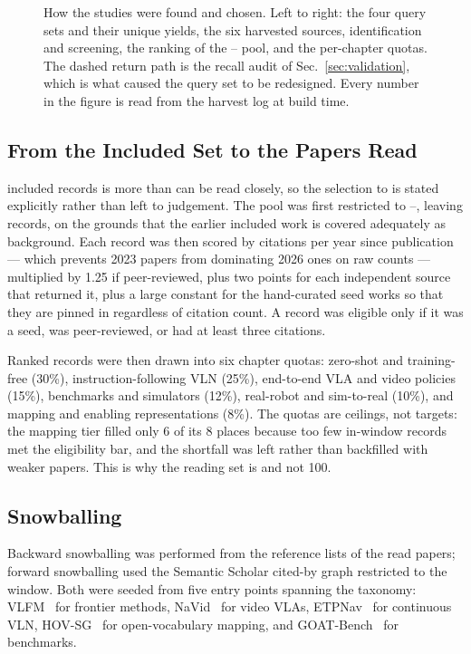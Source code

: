 \documentclass[journal]{IEEEtran}
\begin{document}
\begin{figure}[!t]
  \centering
  \resizebox{\textwidth}{!}{}
  \caption{How the \ReadTotal{} studies were found and chosen. Left to
  right: the four query sets and their unique yields, the six harvested
  sources, identification and screening, the ranking of the
  \ReadFrom--\ReadTo{} pool, and the per-chapter quotas. The dashed return
  path is the recall audit of Sec.~\ref{sec:validation}, which is what
  caused the query set to be redesigned. Every number in the figure is read
  from the harvest log at build time.}
  \label{fig:selection}
\end{figure}

\subsection{From the Included Set to the Papers Read}\label{sec:readinglist}
\ScrInclude{} included records is more than can be read closely, so the
selection to \ReadTotal{} is stated explicitly rather than left to
judgement. The pool was first restricted to \ReadFrom--\ReadTo{},
leaving \ReadPool{} records, on the grounds that the earlier included work
is covered adequately as background. Each record was then scored by
citations per year since publication --- which prevents 2023 papers from
dominating 2026 ones on raw counts --- multiplied by 1.25 if peer-reviewed,
plus two points for each independent source that returned it, plus a large
constant for the hand-curated seed works so that they are pinned in
regardless of citation count. A record was eligible only if it was a seed,
was peer-reviewed, or had at least three citations.

Ranked records were then drawn into six chapter quotas: zero-shot and
training-free (30\%), instruction-following VLN (25\%), end-to-end VLA and
video policies (15\%), benchmarks and simulators (12\%), real-robot and
sim-to-real (10\%), and mapping and enabling representations (8\%). The
quotas are ceilings, not targets: the mapping tier filled only 6 of its 8
places because too few in-window records met the eligibility bar, and the
shortfall was left rather than backfilled with weaker papers. This is why
the reading set is \ReadTotal{} and not 100.

\subsection{Snowballing}
Backward snowballing was performed from the reference lists of the
\ReadTotal{} read papers; forward snowballing used the Semantic Scholar
cited-by graph restricted to the window. Both were seeded from five entry
points spanning the taxonomy: VLFM~\cite{yokoyama2024vlfm} for frontier
methods, NaVid~\cite{zhang2024navid} for video VLAs,
ETPNav~\cite{an2025etpnav} for continuous VLN,
HOV-SG~\cite{werby2024hierarchical} for open-vocabulary mapping, and
GOAT-Bench~\cite{khanna2024goat} for benchmarks.
\end{document}
